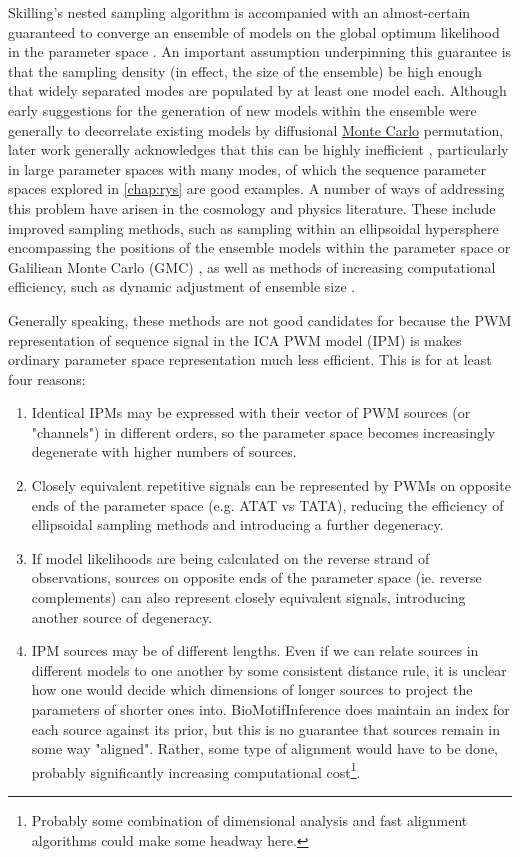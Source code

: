 Skilling's nested sampling algorithm is accompanied with an almost-certain guaranteed to converge an ensemble of models on the global optimum likelihood in the parameter space \cite{Skilling2006}. An important assumption underpinning this guarantee is that the sampling density (in effect, the size of the ensemble) be high enough that widely separated modes are populated by at least one model each. Although early suggestions for the generation of new models within the ensemble were generally to decorrelate existing models by diffusional \hyperref[ssec:MonteCarlo]{Monte Carlo} permutation, later work generally acknowledges that this can be highly inefficient \cite{Skilling2012}, particularly in large parameter spaces with many modes, of which the sequence parameter spaces explored in \autoref{chap:rys} are good examples. A number of ways of addressing this problem have arisen in the cosmology and physics literature. These include improved sampling methods, such as sampling within an ellipsoidal hypersphere encompassing the positions of the ensemble models within the parameter space \cite{Feroz2008,Feroz2009} or Galiliean Monte Carlo (GMC) \cite{Skilling2012}, as well as methods of increasing computational efficiency, such as dynamic adjustment of ensemble size \cite{Higson2019}. 

Generally speaking, these methods are not good candidates for  because the PWM representation of sequence signal in the ICA PWM model (IPM) is makes ordinary parameter space representation much less efficient. This is for at least four reasons:

\begin{enumerate}
    \item\label{identicalmodels} Identical IPMs may be expressed with their vector of PWM sources (or "channels") in different orders, so the parameter space becomes increasingly degenerate with higher numbers of sources.
    \item Closely equivalent repetitive signals can be represented by PWMs on opposite ends of the parameter space (e.g. ATAT vs TATA), reducing the efficiency of ellipsoidal sampling methods and introducing a further degeneracy.
    \item If model likelihoods are being calculated on the reverse strand of observations, sources on opposite ends of the parameter space (ie. reverse complements) can also represent closely equivalent signals, introducing another source of degeneracy.
    \item IPM sources may be of different lengths. Even if we can relate sources in different models to one another by some consistent distance rule, it is unclear how one would decide which dimensions of longer sources to project the parameters of shorter ones into. BioMotifInference does maintain an index for each source against its prior, but this is no guarantee that sources remain in some way "aligned". Rather, some type of alignment would have to be done, probably significantly increasing computational cost\footnote{Probably some combination of dimensional analysis and fast alignment algorithms could make some headway here.}.
\end{enumerate}

